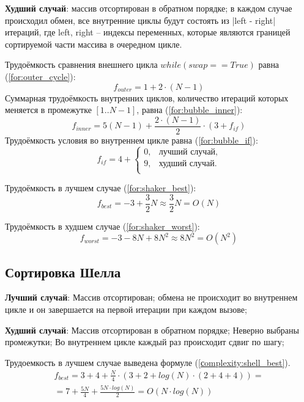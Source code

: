 \textbf{Худший случай}: массив отсортирован в обратном порядке; в каждом случае происходил обмен, все внутренние циклы будут состоять из |left - right| итераций, где left, right -- индексы переменных, которые являются границей сортируемой части массива в очередном цикле.


Трудоёмкость сравнения внешнего цикла $while(swap == True)$ равна (\ref{for:outer_cycle}):
\begin{equation}
	\label{for:outer_cycle}
	f_{outer} = 1 + 2 \cdot (N - 1)
\end{equation}
Суммарная трудоёмкость внутренних циклов, количество итераций которых меняется в промежутке $[1..N-1]$, равна (\ref{for:bubble_inner}):
\begin{equation}
	\label{for:bubble_inner}
	f_{inner} = 5(N - 1) + \frac{2 \cdot (N - 1)}{2} \cdot (3 + f_{if})
\end{equation}
Трудоёмкость условия во внутреннем цикле равна (\ref{for:bubble_if}):
\begin{equation}
	\label{for:bubble_if}
	f_{if} = 4 + \begin{cases}
		0, & \text{лучший случай,}\\
		9, & \text{худший случай.}\\
	\end{cases}
\end{equation}

Трудоёмкость в лучшем случае (\ref{for:shaker_best}):
\begin{equation}
	\label{for:shaker_best}
	f_{best} = -3 + \frac{3}{2} N \approx \frac{3}{2} N = O(N)
\end{equation}

Трудоёмкость в худшем случае (\ref{for:shaker_worst}):
\begin{equation}
	\label{for:shaker_worst}
	f_{worst} = -3 - 8N + 8N^2 \approx 8N^2 = O(N^2)
\end{equation}

\subsection{Сортировка Шелла}
\textbf{Лучший случай}: Массив отсортирован; обмена не происходит во внутреннем цикле и он завершается на первой итерации при каждом вызове; 


\textbf{Худший случай}: Массив отсортирован в обратном порядке; Неверно выбраны промежутки; Во внутреннем цикле каждый раз происходит сдвиг по шагу;


Трудоемкость в лучшем случае выведена формуле (\ref{сomplexity:shell_best}).
\begin{equation}
	\label{сomplexity:shell_best}
	\begin{gathered}
		f_{best} = 3 + 4 + \frac{N}{4} \cdot (3 + 2 + log(N) \cdot (2 + 4 + 4)) = \\
		= 7 + \frac{5N}{4} + \frac{5N \cdot log(N)}{2} = O(N \cdot log(N))
	\end{gathered}
\end{equation}


